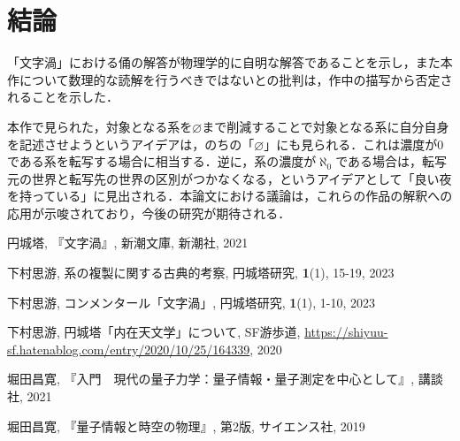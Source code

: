 \documentclass[10pt, a5paper, twoside]{jsarticle}
\theoremstyle{definition}
\begin{document}
	\section{結論}

		「文字渦」における俑の解答が物理学的に自明な解答であることを示し，また本作について数理的な読解を行うべきではないとの批判は，作中の描写から否定されることを示した．

		本作で見られた，対象となる系を$\varnothing$まで削減することで対象となる系に自分自身を記述させようというアイデアは，のちの「$\varnothing$」にも見られる．これは濃度が0である系を転写する場合に相当する．逆に，系の濃度が$\aleph_0$である場合は，転写元の世界と転写先の世界の区別がつかなくなる，というアイデアとして「良い夜を持っている」に見出される．本論文における議論は，これらの作品の解釈への応用が示唆されており，今後の研究が期待される．

	\begin{thebibliography}{99}

		 円城塔, 『文字渦』, 新潮文庫, 新潮社, 2021

		 下村思游, 系の複製に関する古典的考察, 円城塔研究, \textbf{1}(1), 15-19, 2023

		 下村思游, コンメンタール「文字渦」, 円城塔研究, \textbf{1}(1), 1-10, 2023

		 下村思游, 円城塔「内在天文学」について, SF游歩道, \url{https://shiyuu-sf.hatenablog.com/entry/2020/10/25/164339}, 2020

		 堀田昌寛, 『入門　現代の量子力学：量子情報・量子測定を中心として』, 講談社, 2021

		 堀田昌寛, 『量子情報と時空の物理』, 第2版, サイエンス社, 2019

	\end{thebibliography}
\end{document}
